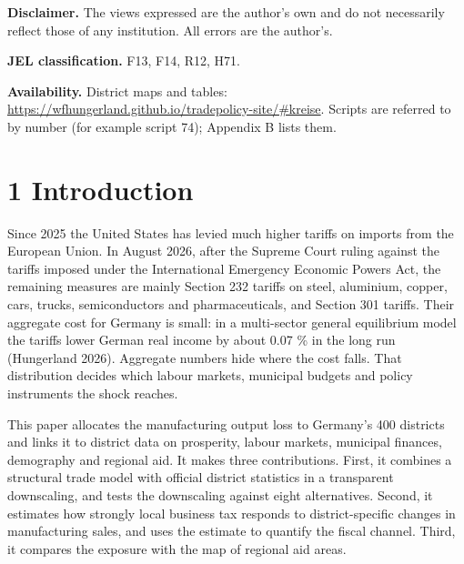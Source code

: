 \documentclass[
  11pt,
]{article}
\begin{document}
\textbf{Disclaimer.} The views expressed are the author's own and do not
necessarily reflect those of any institution. All errors are the
author's.

\textbf{JEL classification.} F13, F14, R12, H71.

\textbf{Availability.} District maps and tables:
\url{https://wfhungerland.github.io/tradepolicy-site/\#kreise}. Scripts
are referred to by number (for example script 74); Appendix B lists
them.

\hypertarget{introduction}{%
\section{1 Introduction}\label{introduction}}

Since 2025 the United States has levied much higher tariffs on imports
from the European Union. In August 2026, after the Supreme Court ruling
against the tariffs imposed under the International Emergency Economic
Powers Act, the remaining measures are mainly Section 232 tariffs on
steel, aluminium, copper, cars, trucks, semiconductors and
pharmaceuticals, and Section 301 tariffs. Their aggregate cost for
Germany is small: in a multi-sector general equilibrium model the
tariffs lower German real income by about 0.07 \% in the long run
(Hungerland 2026). Aggregate numbers hide where the cost falls. That
distribution decides which labour markets, municipal budgets and policy
instruments the shock reaches.

This paper allocates the manufacturing output loss to Germany's 400
districts and links it to district data on prosperity, labour markets,
municipal finances, demography and regional aid. It makes three
contributions. First, it combines a structural trade model with official
district statistics in a transparent downscaling, and tests the
downscaling against eight alternatives. Second, it estimates how
strongly local business tax responds to district-specific changes in
manufacturing sales, and uses the estimate to quantify the fiscal
channel. Third, it compares the exposure with the map of regional aid
areas.
\end{document}
